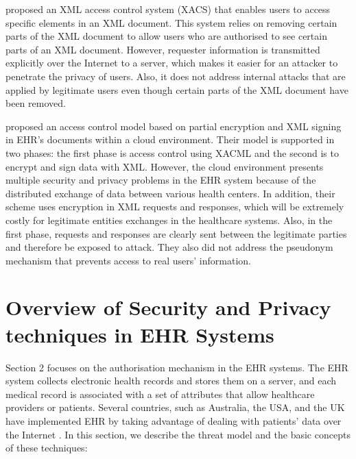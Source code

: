 \documentclass[journal,article,submit,moreauthors,pdftex]{Definitions/mdpi}
\begin{document}
\citet{fp17} proposed an XML access control system (XACS) that enables users to access specific elements in an XML document. This system relies on removing certain parts of the XML document to allow users who are authorised to see certain parts of an XML document. However, requester information is transmitted explicitly over the Internet to a server, which makes it easier for an attacker to penetrate the privacy of users. Also, it does not address internal attacks that are applied by legitimate users even though certain parts of the XML document have been removed.

\citet{fp35} proposed an access control model based on partial encryption and XML signing in EHR's documents within a cloud environment. Their model is supported in two phases: the first phase is access control using XACML and the second is to encrypt and sign data with XML. However, the cloud environment presents multiple security and privacy problems in the EHR system because of the distributed exchange of data between various health centers. In addition, their scheme uses encryption in XML requests and responses, which will be extremely costly for legitimate entities exchanges in the healthcare systems. Also, in the first phase, requests and responses are clearly sent between the legitimate parties and therefore be exposed to attack. They also did not address the pseudonym mechanism that prevents access to real users' information.

\section{Overview of Security and Privacy techniques in EHR Systems}
\label{sec:background}
Section 2 focuses on the authorisation mechanism in the EHR systems. The EHR system collects
electronic health records and stores them on a server, and each medical record is associated with a set of attributes that allow healthcare providers or patients. Several countries, such as Australia, the USA, and the UK have implemented EHR by taking advantage of dealing with patients' data over the Internet \cite{fp1}. In this section, we describe the threat model and the basic concepts of these techniques:
\end{document}
